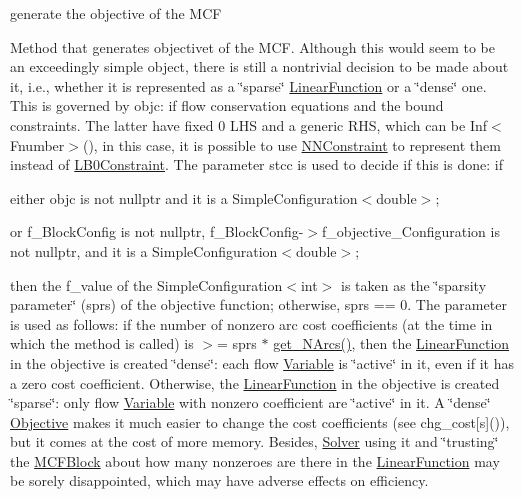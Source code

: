 generate the objective of the M\+CF 

Method that generates objectivet of the M\+CF. Although this would seem to be an exceedingly simple object, there is still a nontrivial decision to be made about it, i.\+e., whether it is represented as a \char`\"{}sparse\char`\"{} \mbox{\hyperlink{class_s_m_spp__di__unipi__it_1_1_linear_function}{Linear\+Function}} or a \char`\"{}dense\char`\"{} one. This is governed by objc\+: if flow conservation equations and the bound constraints. The latter have fixed 0 L\+HS and a generic R\+HS, which can be Inf$<$\+Fnumber$>$(), in this case, it is possible to use \mbox{\hyperlink{class_s_m_spp__di__unipi__it_1_1_n_n_constraint}{N\+N\+Constraint}} to represent them instead of \mbox{\hyperlink{class_s_m_spp__di__unipi__it_1_1_l_b0_constraint}{L\+B0\+Constraint}}. The parameter stcc is used to decide if this is done\+: if


\begin{DoxyItemize}
\item either objc is not nullptr and it is a Simple\+Configuration$<$double$>$;
\item or f\+\_\+\+Block\+Config is not nullptr, f\+\_\+\+Block\+Config-\/$>$f\+\_\+objective\+\_\+\+Configuration is not nullptr, and it is a Simple\+Configuration$<$double$>$;
\end{DoxyItemize}

then the f\+\_\+value of the Simple\+Configuration$<$int$>$ is taken as the \char`\"{}sparsity
parameter\char`\"{} (sprs) of the objective function; otherwise, sprs == 0. The parameter is used as follows\+: if the number of nonzero arc cost coefficients (at the time in which the method is called) is $>$= sprs $\ast$ \mbox{\hyperlink{class_s_m_spp__di__unipi__it_1_1_m_c_f_block_a42c106aa81abe650c7baa0da547ade7e}{get\+\_\+\+N\+Arcs()}}, then the \mbox{\hyperlink{class_s_m_spp__di__unipi__it_1_1_linear_function}{Linear\+Function}} in the objective is created \char`\"{}dense\char`\"{}\+: each flow \mbox{\hyperlink{class_s_m_spp__di__unipi__it_1_1_variable}{Variable}} is \char`\"{}active\char`\"{} in it, even if it has a zero cost coefficient. Otherwise, the \mbox{\hyperlink{class_s_m_spp__di__unipi__it_1_1_linear_function}{Linear\+Function}} in the objective is created \char`\"{}sparse\char`\"{}\+: only flow \mbox{\hyperlink{class_s_m_spp__di__unipi__it_1_1_variable}{Variable}} with nonzero coefficient are \char`\"{}active\char`\"{} in it. A \char`\"{}dense\char`\"{} \mbox{\hyperlink{class_s_m_spp__di__unipi__it_1_1_objective}{Objective}} makes it much easier to change the cost coefficients (see chg\+\_\+cost\mbox{[}s\mbox{]}()), but it comes at the cost of more memory. Besides, \mbox{\hyperlink{class_s_m_spp__di__unipi__it_1_1_solver}{Solver}} using it and \char`\"{}trusting\char`\"{} the \mbox{\hyperlink{class_s_m_spp__di__unipi__it_1_1_m_c_f_block}{M\+C\+F\+Block}} about how many nonzeroes are there in the \mbox{\hyperlink{class_s_m_spp__di__unipi__it_1_1_linear_function}{Linear\+Function}} may be sorely disappointed, which may have adverse effects on efficiency.

